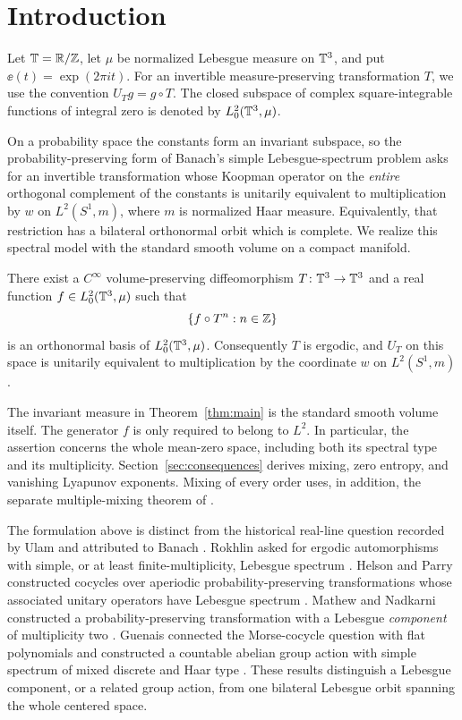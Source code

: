 \section{Introduction}
\label{sec:introduction}
Let $\mathbb T=\mathbb R/\mathbb Z$, let $\mu$ be normalized Lebesgue measure on $\mathbb T^3$,
and put $\ee(t)=\exp(2\pi i t)$. For an invertible measure-preserving
transformation $T$, we use the convention $U_Tg=g\circ T$.
The closed subspace of complex square-integrable functions of integral zero
is denoted by $L^2_0(\mathbb T^3,\mu)$.

On a probability space the constants form an invariant subspace, so the
probability-preserving form of Banach's simple Lebesgue-spectrum problem
asks for an invertible transformation whose Koopman operator on the
\emph{entire} orthogonal complement of the constants is unitarily
equivalent to multiplication by $w$ on $L^2(S^1,m)$, where $m$ is
normalized Haar measure. Equivalently, that restriction has a bilateral
orthonormal orbit which is complete. We realize this spectral model with
the standard smooth volume on a compact manifold.

\begin{theorem}\label{thm:main}
There exist a $C^\infty$ volume-preserving diffeomorphism
$T\colon\mathbb T^3\to\mathbb T^3$ and a real function $f\in L^2_0(\mathbb T^3,\mu)$ such that
\[
                  \{f\circ T^n:n\in\mathbb Z\}
\]
is an orthonormal basis of $L^2_0(\mathbb T^3,\mu)$.
Consequently $T$ is ergodic, and $U_T$ on this space is unitarily equivalent
to multiplication by the coordinate $w$ on $L^2(S^1,m)$.
\end{theorem}

The invariant measure in Theorem~\ref{thm:main} is the standard smooth
volume itself. The generator $f$ is only required to belong to $L^2$.
In particular, the assertion concerns the whole mean-zero space, including
both its spectral type and its multiplicity.
Section~\ref{sec:consequences} derives mixing, zero entropy, and vanishing
Lyapunov exponents. Mixing of every order uses, in addition, the separate
multiple-mixing theorem of \cite{MultipleMixing2026}.

The formulation above is distinct from the historical real-line question
recorded by Ulam and attributed to Banach \cite[\S 6, p.~76]{Ulam1960}.
Rokhlin asked for ergodic automorphisms with simple, or at least
finite-multiplicity, Lebesgue spectrum
\cite[\S 4, no.~7, p.~107]{Rokhlin1949}. Helson and Parry constructed
cocycles over aperiodic probability-preserving transformations whose
associated unitary operators have Lebesgue spectrum
\cite[p.~196, Theorem~(a)]{HelsonParry1978}. Mathew and Nadkarni constructed a
probability-preserving transformation with a Lebesgue \emph{component}
of multiplicity two \cite{MathewNadkarni1984}. Guenais connected the
Morse-cocycle question with flat polynomials and constructed a countable
abelian group action with simple spectrum of mixed discrete and Haar
type \cite{Guenais1999}. These results distinguish a Lebesgue component,
or a related group action, from one bilateral Lebesgue orbit spanning
the whole centered space.

